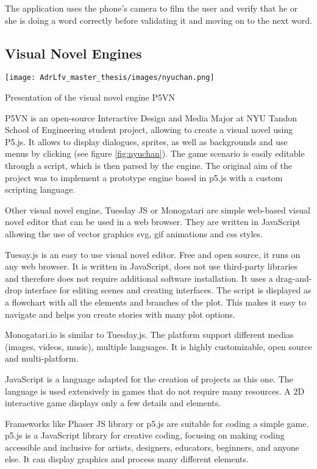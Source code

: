 The application uses the phone's camera to film the user and verify that he or she is doing a word correctly before validating it and moving on to the next word.

\subsection{Visual Novel Engines}

\begin{marginfigure}
    \centering
    \texttt{[image: AdrLfv\_master\_thesis/images/nyuchan.png]}
    \caption{Presentation of the visual novel engine P5VN}
    \label{fig:nyuchan}
\end{marginfigure}

P5VN is an open-source Interactive Design and Media Major at NYU Tandon School of Engineering student project, allowing to create a visual novel using P5.js. It allows to display dialogues, sprites, as well as backgrounds and use menus by clicking (see figure \ref{fig:nyuchan}). The game scenario is easily editable through a script, which is then parsed by the engine. The original aim of the project was to implement a prototype engine based in p5.js with a custom scripting language.  

Other visual novel engine, Tuesday JS \cite{TuesdayJS} or Monogatari \cite{monogatari} are simple web-based visual novel editor that can be used in a web browser. They are written in JavaScript allowing the use of vector graphics svg, gif animations and css styles.

Tuesay.js is an easy to use visual novel editor. Free and open source, it runs on any web browser. It is written in JavaScript, does not use third-party libraries and therefore does not require additional software installation. It uses a drag-and-drop interface for editing scenes and creating interfaces. The script is displayed as a flowchart with all the elements and branches of the plot. This makes it easy to navigate and helps you create stories with many plot options.

Monogatari.io is similar to Tuesday.js. The platform support different medias (images, videos, music), multiple languages. It is highly customizable, open source and multi-platform. 

JavaScript is a language adapted for the creation of projects as this one. 
The language is used extensively in games that do not require many resources. A 2D interactive game displays only a few details and elements.

Frameworks like Phaser JS library or p5.js are suitable for coding a simple game. p5.js is a JavaScript library for creative coding, focusing on making coding accessible and inclusive for artists, designers, educators, beginners, and anyone else. It can display graphics and process many different elements.

